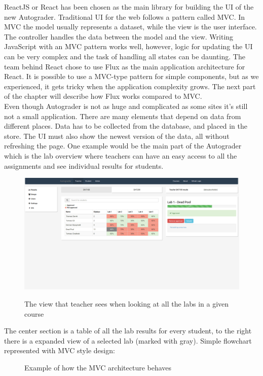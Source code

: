 ReactJS or React has been chosen as the main library for building the UI of the new Autograder. Traditional UI for the web follows a pattern called MVC. In MVC the model usually represents a dataset, while the view is the user interface. The controller handles the data between the model and the view. Writing JavaScript with an MVC pattern works well, however, logic for updating the UI can be very complex and the task of handling all states can be daunting. The team behind React chose to use Flux as the main application architecture for React. It is possible to use a MVC-type pattern for simple components, but as we experienced, it gets tricky when the application complexity grows. The next part of the chapter will describe how Flux works compared to MVC.
\\Even though Autograder is not as huge and complicated as some sites it's still not a small application. There are many elements that depend on data from different places. Data has to be collected from the database, and placed in the store. The UI must also show the newest version of the data, all without refreshing the page. One example would be the main part of the Autograder which is the lab overview where teachers can have an easy access to all the assignments and see individual results for students.
\\
\begin{figure}[h]
  {\includegraphics[width=1\linewidth]{./graphs/laboverviewteacher}}
  \caption{The view that teacher sees when looking at all the labs in a given course}
  \label{fig:laboverviewteacher}
\end{figure}
The center section is a table of all the lab results for every student, to the right there is a expanded view of a selected lab (marked with gray).
Simple flowchart represented with MVC style design:
\begin{figure}[h]
\centering
\scalebox{0.9}{}
\caption{Example of how the MVC architecture behaves}
\end{figure}

